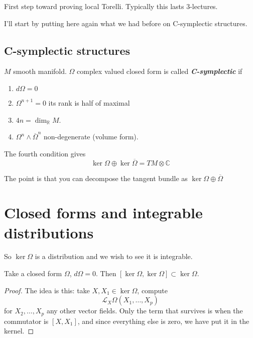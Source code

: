 First step toward proving local Torelli. Typically this lasts 3-lectures.

I'll start by putting here again what we had before on C-symplectic structures.

\subsection{C-symplectic structures}

\begin{defn}\leavevmode
	$M$ smooth manifold. $\Omega$ complex valued closed form is called \textit{\textbf{C-symplectic}} if 
	 \begin{enumerate}
		\item $d\Omega=0$
	
		\item $\Omega^{n+1}=0$ its rank is half of maximal
		\item $4n=\dim_\mathbb{R}M$.
		\item $\Omega^n\wedge \overline{\Omega}^n$ non-degenerate (volume form).
	\end{enumerate}
\end{defn}

\begin{prop}\leavevmode
	The fourth condition gives
	\[\ker \Omega \oplus \ker \overline{\Omega}=TM\otimes \mathbb{C}\]
\end{prop}

\begin{remark}[Dani]\leavevmode
	The point is that you can decompose the tangent bundle as $\ker \Omega\oplus \overline{\Omega}$
\end{remark}

\section{Closed forms and integrable distributions}

So $\ker \Omega$ is a distribution and we wish to see it is integrable.

\begin{thm}\leavevmode
	Take a closed form $\Omega$, $d\Omega=0$. Then $[\ker \Omega,\ker \Omega]\subset \ker \Omega$.
\end{thm}

\begin{proof}\leavevmode
	The idea is this: take $X, X_1\in\ker \Omega$, compute 
	\[\mathcal{L}_X\Omega(X_1,\ldots,X_p)\]
	for $X_2,\ldots,X_p$ any other vector fields. Only the term that survives is when the commutator is $[X,X_1]$, and since everything else is zero, we have put it in the kernel.
\end{proof}

